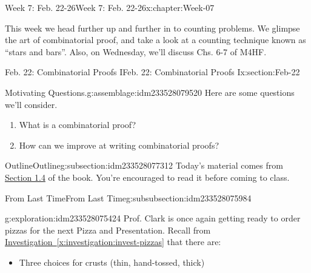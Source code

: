 \documentclass[oneside,10pt,]{book}
\newcommand{\xreffont}{\relax}
\numberwithin{equation}{section}
\begin{document}
\begin{chapterptx}{Week 7: Feb. 22-26}{}{Week 7: Feb. 22-26}{}{}{x:chapter:Week-07}
\begin{introduction}{}%
This week we head further up and further in to counting problems. We glimpse the art of combinatorial proof, and take a look at a counting technique known as ``stars and bars''. Also, on Wednesday, we'll discuss Chs. 6-7 of M4HF.%
\end{introduction}%
%
%
\typeout{************************************************}
\typeout{************************************************}
%
\begin{sectionptx}{Feb. 22: Combinatorial Proofs I}{}{Feb. 22: Combinatorial Proofs I}{}{}{x:section:Feb-22}
\begin{introduction}{}%
\begin{assemblage}{Motivating Questions.}{g:assemblage:idm233528079520}%
Here are some questions we'll consider. %
\begin{enumerate}
\item{}What is a combinatorial proof?%
\item{}How can we improve at writing combinatorial proofs?%
\end{enumerate}
%
\end{assemblage}
\end{introduction}%
%
%
\typeout{************************************************}
\typeout{************************************************}
%
\begin{subsectionptx}{Outline}{}{Outline}{}{}{g:subsection:idm233528077312}
Today's material comes from \href{http://discrete.openmathbooks.org/dmoi3/sec_comb-proofs.html}{Section 1.4} of the book. You're encouraged to read it before coming to class.%
%
%
\typeout{************************************************}
\typeout{************************************************}
%
\begin{subsubsectionptx}{From Last Time}{}{From Last Time}{}{}{g:subsubsection:idm233528075984}
\begin{exploration}{}{g:exploration:idm233528075424}%
Prof. Clark is once again getting ready to order pizzas for the next Pizza and Presentation. Recall from \hyperref[x:investigation:invest-pizzas]{Investigation~{\xreffont\ref{x:investigation:invest-pizzas}}} that there are:%
%
\begin{itemize}[label=\textbullet]
\item{}Three choices for crusts (thin, hand-tossed, thick)%

\end{itemize}
\end{exploration}
\end{subsubsectionptx}
\end{subsectionptx}
\end{sectionptx}
\end{chapterptx}
\end{document}
